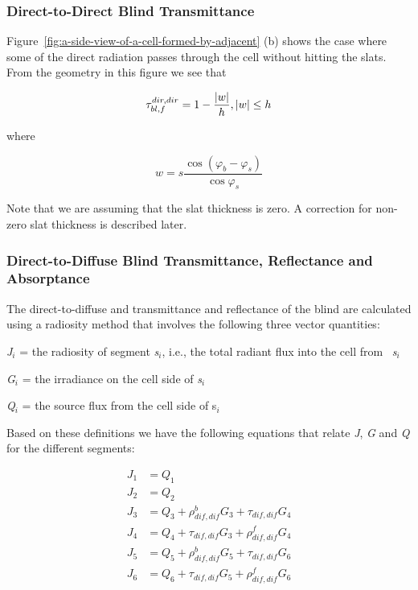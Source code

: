 \subsubsection{Direct-to-Direct Blind Transmittance}\label{direct-to-direct-blind-transmittance}

Figure~\ref{fig:a-side-view-of-a-cell-formed-by-adjacent} (b) shows the case where some of the direct radiation passes through the cell without hitting the slats. From the geometry in this figure we see that

\begin{equation}
\tau_{bl,f}^{dir,dir} = 1 - \frac{{|w|}}{h},{\rm{       }}|w|{\rm{ }} \le {\rm{ }}h
\end{equation}

where

\begin{equation}
w = s\frac{{\cos ({\varphi_b} - {\varphi_s})}}{{\cos {\varphi_s}}}
\end{equation}

Note that we are assuming that the slat thickness is zero. A correction for non-zero slat thickness is described later.

\subsubsection{Direct-to-Diffuse Blind Transmittance, Reflectance and Absorptance}\label{direct-to-diffuse-blind-transmittance-reflectance-and-absorptance}

The direct-to-diffuse and transmittance and reflectance of the blind are calculated using a radiosity method that involves the following three vector quantities:

\emph{J\(_{i}\)} = the radiosity of segment \emph{s\(_{i}\)}, i.e., the total radiant flux into the cell from~ \emph{s\(_{i}\)}

\emph{G\(_{i}\)} = the irradiance on the cell side of \emph{s\(_{i}\)}

\emph{Q\(_{i}\)} = the source flux from the cell side of s\emph{\(_{i}\)}

Based on these definitions we have the following equations that relate \emph{J}, \emph{G} and \emph{Q} for the different segments:

\begin{equation}
  \begin{array}{rl}
    J_1 & = Q_1 \\
    J_2 & = Q_2 \\
    J_3 & = Q_3 + \rho_{dif,dif}^b G_3 + \tau_{dif,dif} G_4 \\
    J_4 & = Q_4 + \tau_{dif,dif} G_3 + \rho_{dif,dif}^f G_4 \\
    J_5 & = Q_5 + \rho_{dif,dif}^b G_5 + \tau_{dif,dif} G_6 \\
    J_6 & = Q_6 + \tau_{dif,dif} G_5 + \rho_{dif,dif}^f G_6
  \end{array}
\end{equation}

